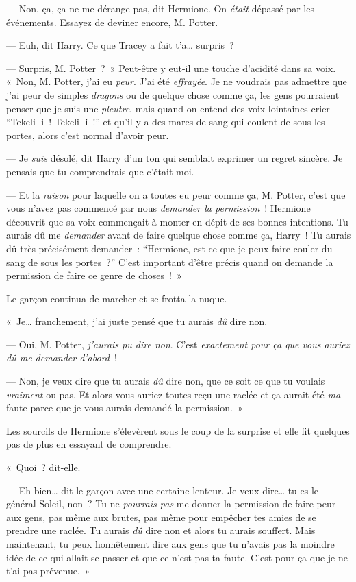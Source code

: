 --- Non, ça, ça ne me dérange pas, dit Hermione.
On \emph{était} dépassé par les événements.
Essayez de deviner encore, M. Potter.

--- Euh, dit Harry.
Ce que Tracey a fait t'a… surpris~?

--- Surpris, M. Potter~?~»
Peut-être y eut-il une touche d'acidité dans sa voix.
«~Non, M. Potter, j'ai eu \emph{peur}.
J'ai été \emph{effrayée}.
Je ne voudrais pas admettre que j'ai peur de simples \emph{dragons} ou de quelque chose comme ça, les gens pourraient penser que je suis une \emph{pleutre}, mais quand on entend des voix lointaines crier “Tekeli-li~!
Tekeli-li~!” et qu'il y a des mares de sang qui coulent de sous les portes, alors c'est normal d'avoir peur.

--- Je \emph{suis} désolé, dit Harry d'un ton qui semblait exprimer un regret sincère.
Je pensais que tu comprendrais que c'était moi.

--- Et la \emph{raison} pour laquelle on a toutes eu peur comme ça, M. Potter, c'est que vous n'avez pas commencé par nous \emph{demander la permission}~!
Hermione découvrit que sa voix commençait à monter en dépit de ses bonnes intentions.
Tu aurais dû me \emph{demander} avant de faire quelque chose comme ça, Harry~!
Tu aurais dû très précisément demander~: “Hermione, est-ce que je peux faire couler du sang de sous les portes~?” C'est important d'être précis quand on demande la permission de faire ce genre de choses~!~»

Le garçon continua de marcher et se frotta la nuque.

«~Je… franchement, j'ai juste pensé que tu aurais \emph{dû} dire non.

--- Oui, M. Potter, \emph{j'aurais pu dire non}.
C'est \emph{exactement pour ça que vous auriez dû me demander d'abord}~!

--- Non, je veux dire que tu aurais \emph{dû} dire non, que ce soit ce que tu voulais \emph{vraiment} ou pas.
Et alors vous auriez toutes reçu une raclée et ça aurait été \emph{ma} faute parce que je vous aurais demandé la permission.~»

Les sourcils de Hermione s'élevèrent sous le coup de la surprise et elle fit quelques pas de plus en essayant de comprendre.

«~Quoi~? dit-elle.

--- Eh bien… dit le garçon avec une certaine lenteur.
Je veux dire… tu es le général Soleil, non~?
Tu ne \emph{pourrais pas} me donner la permission de faire peur aux gens, pas même aux brutes, pas même pour empêcher tes amies de se prendre une raclée.
Tu aurais \emph{dû} dire non et alors tu aurais souffert.
Mais maintenant, tu peux honnêtement dire aux gens que tu n'avais pas la moindre idée de ce qui allait se passer et que ce n'est pas ta faute.
C'est pour ça que je ne t'ai pas prévenue.~»

